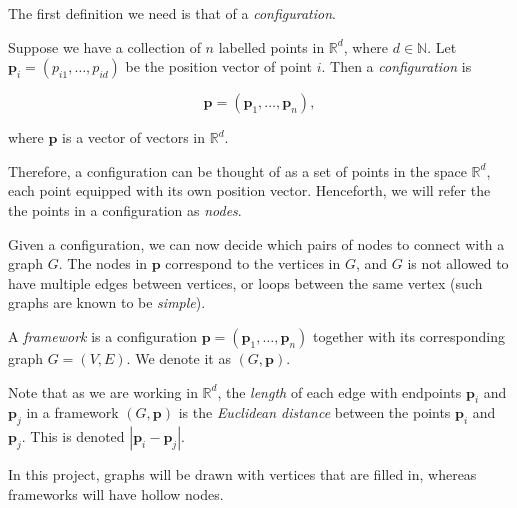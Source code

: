 \noindent
The first definition we need is that of a \textit{configuration}.

\begin{definition}
    Suppose we have a collection of $n$ labelled points in $\mathbb{R}^d$, where $d \in \mathbb{N}$. Let $\mathbf{p}_i = (p_{i1}, \hdots, p_{id})$ be the position vector of point $i$. Then a \textit{configuration} is

\[
\mathbf{p} = (\mathbf{p}_1, \hdots, \mathbf{p}_n),
\]

\begin{flushleft}
where $\mathbf{p}$ is a vector of vectors in $\mathbb{R}^d$.     
\end{flushleft}
\end{definition}

\begin{flushleft}
Therefore, a configuration can be thought of as a set of points in the space $\mathbb{R}^d$, each point equipped with its own position vector. Henceforth, we will refer the the points in a configuration as \textit{nodes}. 
\end{flushleft}

\begin{flushleft}
Given a configuration, we can now decide which pairs of nodes to connect with a graph $G$. The nodes in $\mathbf{p}$ correspond to the vertices in $G$, and $G$ is not allowed to have multiple edges between vertices, or loops between the same vertex (such graphs are known to be \textit{simple}).
\end{flushleft}

\begin{definition}
    A \textit{framework} is a configuration $\mathbf{p} = (\mathbf{p}_1, \hdots, \mathbf{p}_n)$ together with its corresponding graph $G = (V,E)$. We denote it as $(G,\mathbf{p})$.
\end{definition}

\begin{flushleft}
Note that as we are working in $\mathbb{R}^d$, the \textit{length} of each edge with endpoints $\mathbf{p}_i$ and $\mathbf{p}_j$ in a framework $(G,\mathbf{p})$ is the \textit{Euclidean distance} between the points $\mathbf{p}_i$ and $\mathbf{p}_j$. This is denoted $|\mathbf{p}_i - \mathbf{p}_j|$.

In this project, graphs will be drawn with vertices that are filled in, whereas frameworks will have hollow nodes. 
\end{flushleft}

